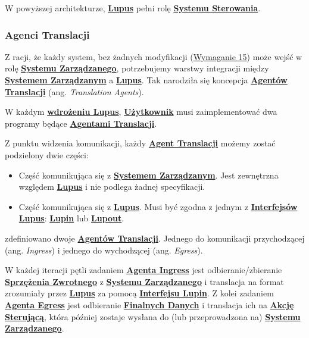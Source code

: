 W powyższej architekturze, \hyperlink{def:lupus}{\textbf{Lupus}} pełni rolę \hyperlink{def:system-sterowania}{\textbf{Systemu Sterowania}}.


\subsubsection{Agenci Translacji}
Z racji, że każdy system, bez żadnych modyfikacji (\hyperref[req:15]{Wymaganie 15}) może wejść w rolę \hyperlink{def:system-zarzadzany}{\textbf{Systemu Zarządzanego}}, potrzebujemy warstwy integracji między \hyperlink{def:system-zarzadzany}{\textbf{Systemem Zarządzanym}} a \hyperlink{def:lupus}{\textbf{Lupus}}. Tak narodziła się koncepcja \hyperlink{def:agent-translacji}{\textbf{Agentów Translacji}} (ang. \textit{Translation Agents}). 

W każdym \hyperlink{def:wdrozenie-lupus}{\textbf{wdrożeniu Lupus}}, \hyperlink{def:uzytkownik}{\textbf{Użytkownik}} musi zaimplementować dwa programy będące \hyperlink{def:agent-translacji}{\textbf{Agentami Translacji}}. 

Z punktu widzenia komunikacji, każdy \hyperlink{def:agent-translacji}{\textbf{Agent Translacji}} możemy zostać podzielony dwie części:
\begin{itemize}
    \item Część komunikująca się z \hyperlink{def:system-zarzadzany}{\textbf{Systemem Zarządzanym}}. Jest zewnętrzna względem \hyperlink{def:lupus}{\textbf{Lupus}} i nie podlega żadnej specyfikacji.
    \item Część komunikująca się z \hyperlink{def:lupus}{\textbf{Lupus}}. Musi być zgodna z jednym z \hyperlink{def:interfejsy-lupus}{\textbf{Interfejsów Lupus}}: \hyperlink{def:interfejs-lupin}{\textbf{Lupin}} lub \hyperlink{def:interfejs-lupout}{\textbf{Lupout}}.
\end{itemize}

zdefiniowano dwoje \hyperlink{def:agent-translacji}{\textbf{Agentów Translacji}}. Jednego do komunikacji przychodzącej (ang. \textit{Ingress}) i jednego do wychodzącej (ang. \textit{Egress}). 

W każdej iteracji pętli zadaniem \hyperlink{def:agent-ingress}{\textbf{Agenta Ingress}} jest odbieranie/zbieranie \hyperlink{def:sprzezenie-zwrotne}{\textbf{Sprzężenia Zwrotnego}} z \hyperlink{def:system-zarzadzany}{\textbf{Systemu Zarządzanego}} i translacja na format zrozumiały przez \hyperlink{def:lupus}{\textbf{Lupus}} za pomocą \hyperlink{def:interfejs-lupin}{\textbf{Interfejsu Lupin}}. Z kolei zadaniem \hyperlink{def:agent-egress}{\textbf{Agenta Egress}} jest odbieranie \hyperlink{def:finalne-dane}{\textbf{Finalnych Danych}} i translacja ich na \hyperlink{def:akcja-sterujaca}{\textbf{Akcję Sterującą}}, która później zostaje wysłana do (lub przeprowadzona na) \hyperlink{def:system-zarzadzany}{\textbf{Systemu Zarządzanego}}.

